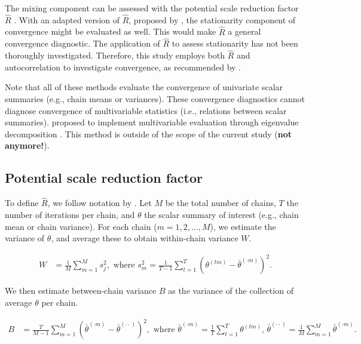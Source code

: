 \documentclass[Royal,times,sageh]{sagej}
\begin{document}
The mixing component can be assessed with the potential scale reduction
factor \(\widehat{R}\) \citep[a.k.a. `Gelman-Rubin
statistic';][]{gelm92}. With an adapted version of \(\widehat{R}\),
proposed by \citet{veht19}, the stationarity component of convergence
might be evaluated as well. This would make \(\widehat{R}\) a general
convergence diagnostic. The application of \(\widehat{R}\) to assess
stationarity has not been thoroughly investigated. Therefore, this study
employs both \(\widehat{R}\) and autocorrelation to investigate
convergence, as recommended by \citep[p.~898]{cowl96}.

Note that all of these methods evaluate the convergence of univariate
scalar summaries (e.g., chain means or variances). These convergence
diagnostics cannot diagnose convergence of multivariable statistics
(i.e., relations between scalar summaries). \citet{buur18} proposed to
implement multivariable evaluation through eigenvalue decomposition
\citep{mack03}. This method is outside of the scope of the current study
(\textbf{not anymore!}).

\hypertarget{potential-scale-reduction-factor}{%
\subsection{Potential scale reduction
factor}\label{potential-scale-reduction-factor}}

To define \(\widehat{R}\), we follow notation by \citep[p.~5]{veht19}.
Let \(M\) be the total number of chains, \(T\) the number of iterations
per chain, and \(\theta\) the scalar summary of interest (e.g., chain
mean or chain variance). For each chain (\(m = 1, 2, \dots, M\)), we
estimate the variance of \(\theta\), and average these to obtain
within-chain variance \(W\).

\begin{align*}
W&=\frac{1}{M} \sum_{m=1}^{M} s_{j}^{2},  \text { where } s_{m}^{2}=\frac{1}{T-1} \sum_{t=1}^{T}\left(\theta^{(t m)}-\bar{\theta}^{(\cdot m)}\right)^{2}. 
\end{align*}

We then estimate between-chain variance \(B\) as the variance of the
collection of average \(\theta\) per chain.

\begin{align*}
B&=\frac{T}{M-1} \sum_{m=1}^{M}\left(\bar{\theta}^{(\cdot m)}-\bar{\theta}^{(\cdot \cdot)}\right)^{2}, \text { where } \bar{\theta}^{(\cdot m)}=\frac{1}{T} \sum_{t=1}^{T} \theta^{(t m)} \text{, } \bar{\theta}^{(\cdot \cdot)}=\frac{1}{M} \sum_{m=1}^{M} \bar{\theta}^{(\cdot m)}. 
\end{align*}
\end{document}
